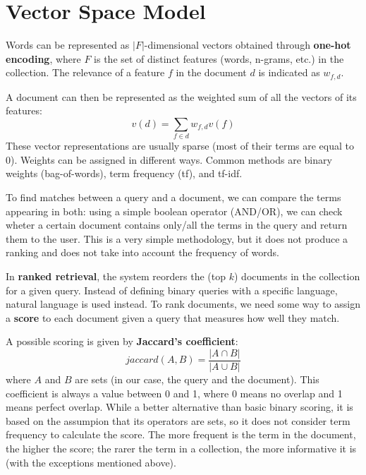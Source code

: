 \section{Vector Space Model}

Words can be represented as $|F|$-dimensional vectors obtained through \textbf{one-hot encoding}, where $F$ is the set of distinct features (words, n-grams, etc.) in the collection. The relevance of a feature $f$ in the document $d$ is indicated as $w_{f,d}$.

A document can then be represented as the weighted sum of all the vectors of its features:
\begin{equation*}
    v(d) = \sum_{f \in d} w_{f,d} v(f)
\end{equation*} 
These vector representations are usually sparse (most of their terms are equal to 0). Weights can be assigned in different ways. Common methods are binary weights (bag-of-words), term frequency (tf), and tf-idf.

To find matches between a query and a document, we can compare the terms appearing in both: using a simple boolean operator (AND/OR), we can check wheter a certain document contains only/all the terms in the query and return them to the user. This is a very simple methodology, but it does not produce a ranking and does not take into account the frequency of words.

In \textbf{ranked retrieval}, the system reorders the (top $k$) documents in the collection for a given query. Instead of defining binary queries with a specific language, natural language is used instead. To rank documents, we need some way to assign a \textbf{score} to each document given a query that measures how well they match.

A possible scoring is given by \textbf{Jaccard's coefficient}:
\begin{equation*}
    \textit{jaccard}(A,B) = \frac{|A \cap B|}{|A \cup B|}
\end{equation*}
where $A$ and $B$ are sets (in our case, the query and the document). This coefficient is always a value between 0 and 1, where 0 means no overlap and 1 means perfect overlap. While a better alternative than basic binary scoring, it is based on the assumpion that its operators are sets, so it does not consider term frequency to calculate the score. The more frequent is the term in the document, the higher the score; the rarer the term in a collection, the more informative it is (with the exceptions mentioned above).

